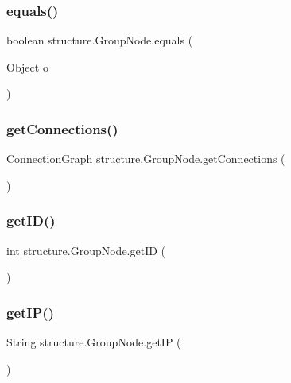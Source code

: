 \subsubsection{\texorpdfstring{equals()}{equals()}}
{\footnotesize\ttfamily boolean structure.\+Group\+Node.\+equals (\begin{DoxyParamCaption}\item[{Object}]{o }\end{DoxyParamCaption})}

\mbox{\label{classstructure_1_1_group_node_a13b5457f1b989a0aa8da6440610882fb}} 
\subsubsection{\texorpdfstring{get\+Connections()}{getConnections()}}
{\footnotesize\ttfamily \hyperlink{classstructure_1_1_connection_graph}{Connection\+Graph} structure.\+Group\+Node.\+get\+Connections (\begin{DoxyParamCaption}{ }\end{DoxyParamCaption})}

\mbox{\label{classstructure_1_1_group_node_afb3b82694003309b6218f908110838c6}} 
\subsubsection{\texorpdfstring{get\+I\+D()}{getID()}}
{\footnotesize\ttfamily int structure.\+Group\+Node.\+get\+ID (\begin{DoxyParamCaption}{ }\end{DoxyParamCaption})}

\mbox{\label{classstructure_1_1_group_node_ac2f64cbb8eb9332df8663e80e1bb3f61}} 
\subsubsection{\texorpdfstring{get\+I\+P()}{getIP()}}
{\footnotesize\ttfamily String structure.\+Group\+Node.\+get\+IP (\begin{DoxyParamCaption}{ }\end{DoxyParamCaption})}

